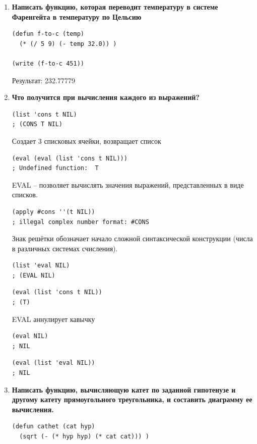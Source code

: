 \documentclass[a4paper,14pt]{extreport} %
\begin{document}
\begin{enumerate}
\item \textbf{Написать функцию, которая переводит температуру в системе Фаренгейта в температуру по Цельсию}

\begin{lstlisting}
(defun f-to-c (temp)
  (* (/ 5 9) (- temp 32.0)) )
  
(write (f-to-c 451)) 
\end{lstlisting}

Результат: 232.77779

\item \textbf{Что получится при вычисления каждого из выражений?}

\begin{lstlisting}
(list 'cons t NIL)
; (CONS T NIL)
\end{lstlisting}
Создает 3 списковых ячейки, возвращает список

\begin{lstlisting}
(eval (eval (list 'cons t NIL)))
; Undefined function:  T
\end{lstlisting}
EVAL -- позволяет вычислять значения выражений, представленных в виде списков. 

\begin{lstlisting}
(apply #cons ''(t NIL))
; illegal complex number format: #CONS
\end{lstlisting}
Знак решётки обозначает начало сложной синтаксической конструкции (числа в различных системах счисления).

\begin{lstlisting}
(list 'eval NIL)
; (EVAL NIL)
\end{lstlisting}

\begin{lstlisting}
(eval (list 'cons t NIL))
; (T)
\end{lstlisting}
EVAL аннулирует кавычку

\begin{lstlisting}
(eval NIL)
; NIL
\end{lstlisting}

\begin{lstlisting}
(eval (list 'eval NIL))
; NIL
\end{lstlisting}

\item \textbf{Написать функцию, вычисляющую катет по заданной гипотенузе и другому катету прямоугольного треугольника, и составить диаграмму ее вычисления.}

\begin{lstlisting}
(defun cathet (cat hyp)
  (sqrt (- (* hyp hyp) (* cat cat))) )


\end{lstlisting}
\end{enumerate}
\end{document}
